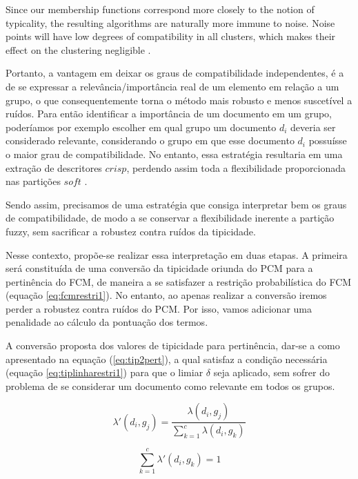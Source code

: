 \begin{citacao}
Since our membership functions correspond more closely to
the notion of typicality, the resulting algorithms are naturally
more immune to noise. Noise points will have low degrees
of compatibility in all clusters, which makes their effect on
the clustering negligible \cite{Krishnapuram1993}.
\end{citacao}
Portanto, a vantagem em deixar os graus de compatibilidade independentes, é a de se expressar a
relevância/importância real de um elemento em relação a um grupo, o que consequentemente torna o
método mais robusto e menos suscetível a ruídos. Para então identificar a importância de um
documento em um grupo, poderíamos por exemplo escolher em qual grupo um documento $d_i$ deveria ser
considerado relevante, considerando o grupo em que esse documento $d_i$ possuísse o maior grau de
compatibilidade. No entanto, essa estratégia resultaria em uma extração de descritores $crisp$,
perdendo assim toda a flexibilidade proporcionada nas partições $soft$ \cite{Nogueira2013}.

Sendo assim, precisamos de uma estratégia que consiga interpretar bem os graus de compatibilidade,
de modo a se conservar a flexibilidade inerente a partição fuzzy, sem sacrificar a robustez contra
ruídos da tipicidade. 

Nesse contexto, propõe-se realizar essa interpretação em duas etapas. A primeira será constituída de
uma conversão da tipicidade oriunda do PCM para a pertinência do FCM, de maneira a se satisfazer a
restrição probabilística do FCM (equação \ref{eq:fcmrestri1}). No entanto, ao apenas realizar a
conversão iremos perder a robustez contra ruídos do PCM. Por isso, vamos adicionar uma penalidade ao
cálculo da pontuação dos termos.

A conversão proposta dos valores de tipicidade para pertinência, dar-se a como apresentado na
equação (\ref{eq:tip2pert}), a qual satisfaz a condição necessária (equação
\ref{eq:tiplinharestri1}) para que o limiar $\delta$ seja aplicado, sem sofrer do problema de se
considerar um documento como relevante em todos os grupos.

\begin{equation}
  \lambda'(d_i,g_j) = \frac{\lambda(d_i,g_j)}{\sum_{k=1}^c \lambda(d_i,g_k)}
  \label{eq:tip2pert}
\end{equation}

\begin{equation}
  \sum_{k=1}^c \lambda'(d_i,g_k) = 1
  \label{eq:tiplinharestri1}
\end{equation}

